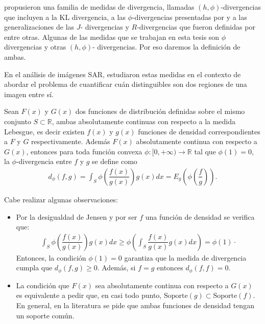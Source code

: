 \citet{Salicru1994} propusieron una familia de medidas de divergencia, llamadas $(h,\phi)$-divergencias que incluyen a la KL divergencia, a las $\phi$-divergencias presentadas por \citet{Csiszar1967} y a las generalizaciones de las $J$- divergencias y $R$-divergencias que fueron definidas por \citet{Taneja1989} entre otras. Algunas de las medidas que se trabajan en esta tesis son $\phi$ divergencias y otras  $(h,\phi)$- divergencias. 
Por eso daremos la definición de ambas.

En el análisis de imágenes SAR, \citet{Nascimento2009} estudiaron estas medidas en el contexto de abordar el problema de cuantificar cuán distinguibles son dos regiones de una imagen entre sí.

\begin{definition}
	\label{fiDivergencia}
	Sean $F(x)$ y $G(x)$ dos funciones de distribución definidas sobre el mismo conjunto $S \subset \mathbb{R}$, ambas absolutamente continuas con respecto a la medida Lebesgue, es decir existen $f(x)$ y $g(x)$ funciones de densidad correspondientes a $F$ y $G$ respectivamente. Además $F(x)$ absolutamente continua con respecto a $G(x)$, entonces para toda función convexa $\phi:[0,+\infty)\rightarrow \mathbb{R}$ tal que $\phi(1)=0$, la $\phi$-divergencia entre $f$ y $g$ se define como
	\begin{align}
	d_{\phi}(f, g)=\int_{S}  \phi\left(\dfrac{f(x)}{g(x)}\right) g(x) dx=E_{g}\left(\phi\left(\dfrac{f}{g}\right)\right).
	\end{align}
\end{definition}

Cabe realizar algunas observaciones:

\begin{itemize}
	\item Por la desigualdad de Jensen y por ser $f$ una función de densidad se verifica que:
	\begin{align}
	\displaystyle \int_{S} \phi\left(\dfrac{f(x)}{g(x)}\right) g(x) dx \geq \phi\left(\int_{S} \dfrac{f(x)}{g(x)} g(x) dx\right)=\phi(1)\cdot
	\end{align}
	Entonces, la condición $\phi(1)=0$ garantiza que la medida de divergencia cumpla que $d_{\phi}(f, g) \geq 0.$ Además, si $f=g$ entonces $d_{\phi}(f, f)= 0.$ 
	\item La condición que $F(x)$ sea absolutamente continua con respecto a $G(x)$ es equivalente a pedir que, en casi todo punto, $\text{Soporte}(g) \subset \text{Soporte}(f).$ En general, en la literatura se pide que ambas funciones de densidad tengan un soporte común.
\end{itemize}


